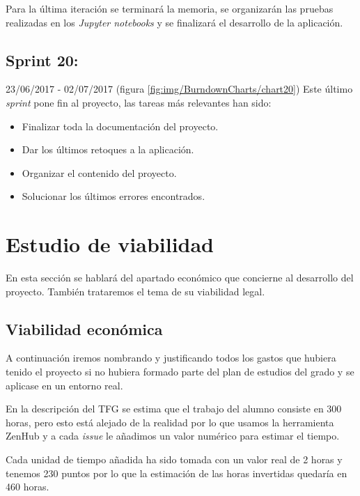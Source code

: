 Para la última iteración se terminará la memoria, se organizarán las pruebas realizadas en los \textit{Jupyter notebooks} y se finalizará el desarrollo de la aplicación.

\subsection{Sprint 20:}
23/06/2017 - 02/07/2017 (figura \ref{fig:img/BurndownCharts/chart20})
Este último \textit{sprint} pone fin al proyecto, las tareas más relevantes han sido:
\begin{itemize}
    \item Finalizar toda la documentación del proyecto.
    \item Dar los últimos retoques a la aplicación.
    \item Organizar el contenido del proyecto.
    \item Solucionar los últimos errores encontrados.
\end{itemize}

\newpage
\section{Estudio de viabilidad}

En esta sección se hablará del apartado económico que concierne al desarrollo del proyecto. También trataremos el tema de su viabilidad legal.

\subsection{Viabilidad económica}

A continuación iremos nombrando y justificando todos los gastos que hubiera tenido el proyecto si no hubiera formado parte del plan de estudios del grado y se aplicase en un entorno real.

En la descripción del TFG se estima que el trabajo del alumno consiste en 300 horas, pero esto está alejado de la realidad por lo que usamos la herramienta ZenHub y a cada \textit{issue} le añadimos un valor numérico para estimar el tiempo. 

Cada unidad de tiempo añadida ha sido tomada con un valor real de 2 horas y tenemos 230 puntos por lo que la estimación de las horas invertidas quedaría en 460 horas.

